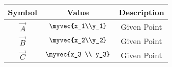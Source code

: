 \begin{tabular}{|c|c|c|}
     \hline
     \textbf{Symbol}& \textbf{Value} & \textbf{Description} \\
     \hline
     $\vec{A}$ & $\myvec{x_1\\y_1}$ & Given Point \\ 
     \hline
     $\vec{B}$  & $\myvec{x_2\\y_2}$ & Given Point \\ 
     \hline
     $\vec{C}$ & $\myvec{x_3 \\ y_3}$ & Given Point \\ 
     \hline
\end{tabular}
